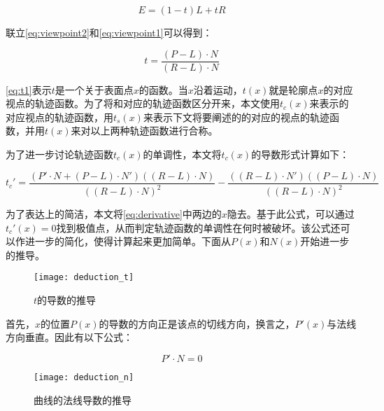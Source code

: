\begin{equation}\label{eq:viewpoint1}
    E = (1-t)L+t R
\end{equation}

联立\autoref{eq:viewpoint2}和\autoref{eq:viewpoint1}可以得到：

\begin{equation}\label{eq:t1}
t = \frac{(P-L)\cdot{N}}{(R-L)\cdot{N}}
\end{equation}

\autoref{eq:t1}表示$t$是一个关于表面点$x$的函数。当$x$沿着\ec{}运动，$t(x)$就是轮廓点$x$的对应视点的轨迹函数。为了将\con{}和\scon{}对应的轨迹函数区分开来，本文使用$t_c(x)$来表示\conp{}的对应视点的轨迹函数，用$t_s(x)$来表示下文将要阐述的\sconp{}的对应的视点的轨迹函数，并用$t(x)$来对以上两种轨迹函数进行合称。

为了进一步讨论轨迹函数$t_c(x)$的单调性，本文将$t_c(x)$的导数形式计算如下：

\begin{equation}\label{eq:derivative}
  t_c' = \frac{(P'\cdot{N}+(P-L)\cdot{N'})((R-L)\cdot{N})}{((R-L)\cdot{N})^2}-\frac{((R-L)\cdot{N'})((P-L)\cdot{N})}{((R-L)\cdot{N})^2}
\end{equation}

为了表达上的简洁，本文将\autoref{eq:derivative}中两边的$x$隐去。基于此公式，可以通过$t_c'(x)=0$找到极值点，从而判定轨迹函数的单调性在何时被破坏。该公式还可以作进一步的简化，使得计算起来更加简单。下面从$P(x)$和$N(x)$开始进一步的推导。

\begin{figure}[bth]
    \centering
    \texttt{[image: deduction\_t]}
    \caption[轨迹函数的推导]{\label{fig:deduction_t}
    $t$的导数的推导}
\end{figure}  

首先，$x$的位置$P(x)$的导数的方向正是该点的切线方向，换言之，$P'(x)$与法线方向垂直。因此有以下公式：

\begin{equation}\label{eq:perp}
    P'\cdot{N} = 0
\end{equation}

\begin{figure}[bth]
    \centering
    \texttt{[image: deduction\_n]}
    \caption[曲线的法线导数的推导]{\label{fig:deduction_n}
    曲线的法线导数的推导}
\end{figure}

